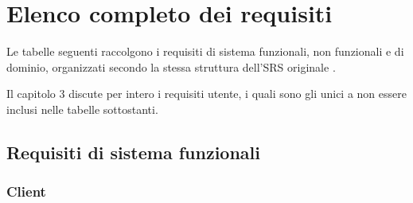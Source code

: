 \chapter{Elenco completo dei requisiti}
\label{app:elenco-requisiti}

Le tabelle seguenti raccolgono i requisiti di sistema funzionali, non funzionali e di dominio, organizzati 
secondo la stessa struttura dell'SRS originale \cite{ramusb-srs}.

Il capitolo 3 discute per intero i requisiti utente, i quali sono gli unici a non essere inclusi nelle 
tabelle sottostanti.

\section{Requisiti di sistema funzionali}

\subsection{Client}

